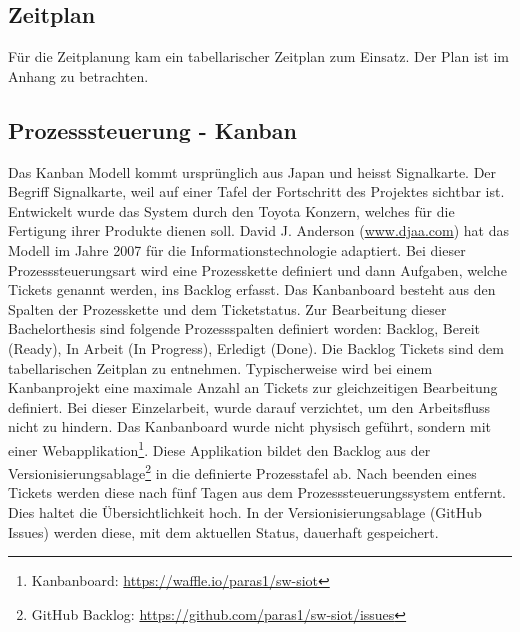 \subsection{Zeitplan}
Für die Zeitplanung kam ein tabellarischer Zeitplan zum Einsatz. Der Plan ist im Anhang zu betrachten.

\subsection{Prozesssteuerung - Kanban}
Das Kanban Modell kommt ursprünglich aus Japan und heisst Signalkarte. Der Begriff Signalkarte, weil auf einer Tafel der Fortschritt des Projektes sichtbar ist. Entwickelt wurde das System durch den Toyota Konzern, welches für die Fertigung ihrer Produkte dienen soll. David J. Anderson (\url{www.djaa.com}) hat das Modell im Jahre 2007 für die Informationstechnologie adaptiert.
Bei dieser Prozesssteuerungsart wird eine Prozesskette definiert und dann Aufgaben, welche Tickets genannt werden, ins Backlog erfasst. Das Kanbanboard besteht aus den Spalten der Prozesskette und dem Ticketstatus. Zur Bearbeitung dieser Bachelorthesis sind folgende Prozessspalten definiert worden: Backlog, Bereit (Ready), In Arbeit (In Progress), Erledigt (Done). Die Backlog Tickets sind dem tabellarischen Zeitplan zu entnehmen.
Typischerweise wird bei einem Kanbanprojekt eine maximale Anzahl an Tickets zur gleichzeitigen Bearbeitung definiert. Bei dieser Einzelarbeit, wurde darauf verzichtet, um den Arbeitsfluss nicht zu hindern.
Das Kanbanboard wurde nicht physisch geführt, sondern mit einer Webapplikation\footnote{Kanbanboard: \url{https://waffle.io/paras1/sw-siot}}. Diese Applikation bildet den Backlog aus der Versionisierungsablage\footnote{GitHub Backlog: \url{https://github.com/paras1/sw-siot/issues}} in die definierte Prozesstafel ab. Nach beenden eines Tickets werden diese nach fünf Tagen aus dem Prozesssteuerungssystem entfernt. Dies haltet die Übersichtlichkeit hoch. In der Versionisierungsablage (GitHub Issues) werden diese, mit dem aktuellen Status, dauerhaft gespeichert.
